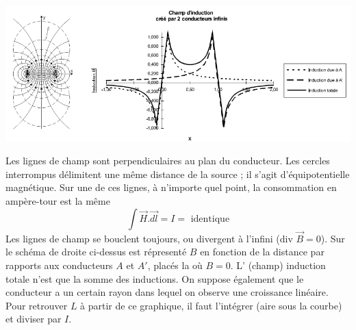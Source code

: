 		\begin{center}
		\includegraphics[scale=0.54]{ch3/image3.png}
		\end{center}
		Les lignes de champ sont perpendiculaires au plan du conducteur. Les 
		cercles interrompus délimitent une même distance de la source ; il 
		s'agit d'équipotentielle magnétique. Sur une de ces lignes, à 
		n'importe quel point, la consommation en ampère-tour est la même 
		\begin{equation}
		\int\vec{H}.\vec{dl} = I = \text{ identique}
		\end{equation}
		Les lignes de champ se bouclent toujours, ou divergent à l'infini 
		(div $\vec{B}=0$). Sur le schéma de droite ci-dessus est répresenté 
		$B$ en fonction de la distance par rapports aux conducteurs $A$ et 
		$A'$, placés la où $B=0$. L' (champ) induction totale n'est que la 
		somme des inductions. On suppose également que le conducteur a un 
		certain rayon dans lequel on observe une croissance linéaire. Pour 
		retrouver $L$ à partir de ce graphique, il faut l'intégrer (aire sous 
		la courbe) et diviser par $I$.
		
